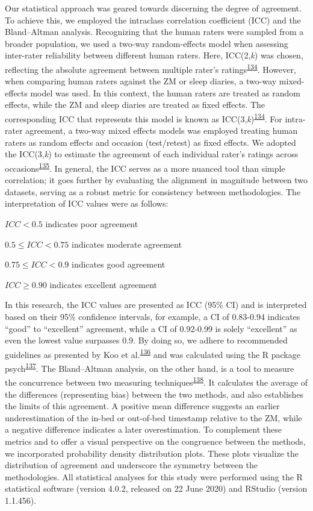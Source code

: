 \documentclass[
  10pt,
]{scrbook}
\begin{document}
Our statistical approach was geared towards discerning the degree of
agreement. To achieve this, we employed the intraclass correlation
coefficient (ICC) and the Bland--Altman analysis. Recognizing that the
human raters were sampled from a broader population, we used a two-way
random-effects model when assessing inter-rater reliability between
different human raters. Here, ICC(2,\emph{k}) was chosen, reflecting the
absolute agreement between multiple rater's
ratings\textsuperscript{\protect\hyperlink{ref-shrout_1979}{134}}.
However, when comparing human raters against the ZM or sleep diaries, a
two-way mixed-effects model was used. In this context, the human raters
are treated as random effects, while the ZM and sleep diaries are
treated as fixed effects. The corresponding ICC that represents this
model is known as
ICC(3,\emph{k})\textsuperscript{\protect\hyperlink{ref-shrout_1979}{134}}.
For intra-rater agreement, a two-way mixed effects models was employed
treating human raters as random effects and occasion (test/retest) as
fixed effects. We adopted the ICC(3,\emph{k}) to estimate the agreement
of each individual rater's ratings across
occasions\textsuperscript{\protect\hyperlink{ref-mcgraw_1996}{135}}. In
general, the ICC serves as a more nuanced tool than simple correlation;
it goes further by evaluating the alignment in magnitude between two
datasets, serving as a robust metric for consistency between
methodologies. The interpretation of ICC values were as follows:

\(ICC < 0.5\) indicates poor agreement

\(0.5 ≤ ICC < 0.75\) indicates moderate agreement

\(0.75 ≤ ICC < 0.9\) indicates good agreement

\(ICC ≥ 0.90\) indicates excellent agreement

In this research, the ICC values are presented as ICC (95\% CI) and is
interpreted based on their 95\% confidence intervals, for example, a CI
of 0.83-0.94 indicates ``good'' to ``excellent'' agreement, while a CI
of 0.92-0.99 is solely ``excellent'' as even the lowest value surpasses
0.9. By doing so, we adhere to recommended guidelines as presented by
Koo et
al.\textsuperscript{\protect\hyperlink{ref-koo_guideline_2016}{136}} and
was calculated using the R package
psych\textsuperscript{\protect\hyperlink{ref-psych}{137}}. The
Bland--Altman analysis, on the other hand, is a tool to measure the
concurrence between two measuring
techniques\textsuperscript{\protect\hyperlink{ref-bland_measuring_1999}{138}}.
It calculates the average of the differences (representing bias) between
the two methods, and also establishes the limits of this agreement. A
positive mean difference suggests an earlier underestimation of the
in-bed or out-of-bed timestamp relative to the ZM, while a negative
difference indicates a later overestimation. To complement these metrics
and to offer a visual perspective on the congruence between the methods,
we incorporated probability density distribution plots. These plots
visualize the distribution of agreement and underscore the symmetry
between the methodologies. All statistical analyses for this study were
performed using the R statistical software (version 4.0.2, released on
22 June 2020) and RStudio (version 1.1.456).
\end{document}
